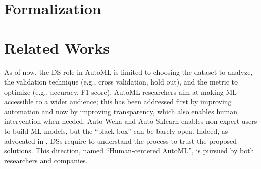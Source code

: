 \section{Formalization}

\section{Related Works}


As of now, the DS role in AutoML is limited to choosing the dataset to analyze, the validation technique (e.g., cross validation, hold out), and the metric to optimize (e.g., accuracy, F1 score).
AutoML researchers aim at making ML accessible to a wider audience;
this has been addressed first by improving automation and now by improving transparency, which also enables human intervention when needed.
Auto-Weka \cite{kotthoff2019auto} and Auto-Sklearn \cite{feurer2019auto} enables non-expert users to build ML models, but the ``black-box'' can be barely open.
Indeed, as advocated in \cite{drozdal2020trust}, DSs require to understand the process to trust the proposed solutions.
This direction, named ``Human-centered AutoML'', is pursued by both researchers and companies.

